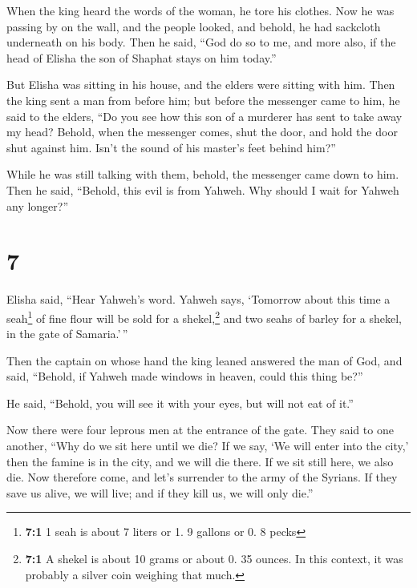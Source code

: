  When the king heard the words of the woman, he tore his
clothes. Now he was passing by on the wall, and the people looked, and
behold, he had sackcloth underneath on his body.  Then he
said, ``God do so to me, and more also, if the head of Elisha the son of
Shaphat stays on him today.''

 But Elisha was sitting in his house, and the elders were
sitting with him. Then the king sent a man from before him; but before
the messenger came to him, he said to the elders, ``Do you see how this
son of a murderer has sent to take away my head? Behold, when the
messenger comes, shut the door, and hold the door shut against him.
Isn't the sound of his master's feet behind him?''

 While he was still talking with them, behold, the
messenger came down to him. Then he said, ``Behold, this evil is from
Yahweh. Why should I wait for Yahweh any longer?''

\hypertarget{section-6}{%
\section{7}\label{section-6}}

 Elisha said, ``Hear Yahweh's word. Yahweh says, `Tomorrow
about this time a seah\footnote{\textbf{7:1} 1 seah is about 7 liters or
  1. 9 gallons or 0. 8 pecks} of fine flour will be sold for a
shekel,\footnote{\textbf{7:1} A shekel is about 10 grams or about 0. 35
  ounces. In this context, it was probably a silver coin weighing that
  much.} and two seahs of barley for a shekel, in the gate of
Samaria.'\,''

 Then the captain on whose hand the king leaned answered
the man of God, and said, ``Behold, if Yahweh made windows in heaven,
could this thing be?''

He said, ``Behold, you will see it with your eyes, but will not eat of
it.''

 Now there were four leprous men at the entrance of the
gate. They said to one another, ``Why do we sit here until we die?
 If we say, `We will enter into the city,' then the famine
is in the city, and we will die there. If we sit still here, we also
die. Now therefore come, and let's surrender to the army of the Syrians.
If they save us alive, we will live; and if they kill us, we will only
die.''

